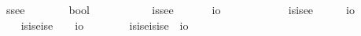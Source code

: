\begin{isabellebody}
\ ssee\ {\isacharequal}\ \ \ \ \ \ \ {\isachardoublequoteopen}{\isacharparenleft}{\isasymlangle}{\isasymzero}{\isasymrangle}{\isasymRightarrow}{\isasymzero}{\isasymRightarrow}bool{\isacharparenright}{\isachardoublequoteclose}\ \ \ \ \ \ \ {\isacharparenleft}{\isachardoublequoteopen}{\isasymlangle}{\isasymlangle}{\isasymzero}{\isasymrangle}{\isacharcomma}{\isasymzero}{\isasymrangle}{\isachardoublequoteclose}{\isacharparenright}\isanewline
\ \ \isamarkupfalse%
\ issee\ {\isacharequal}\ \ \ \ \ \ {\isachardoublequoteopen}{\isacharparenleft}{\isasymlangle}{\isasymzero}{\isasymrangle}{\isasymRightarrow}{\isasymzero}{\isasymRightarrow}io{\isacharparenright}{\isachardoublequoteclose}\ \ \ \ \ \ \ \ {\isacharparenleft}{\isachardoublequoteopen}{\isasymup}{\isasymlangle}{\isasymlangle}{\isasymzero}{\isasymrangle}{\isacharcomma}{\isasymzero}{\isasymrangle}{\isachardoublequoteclose}{\isacharparenright}\isanewline
\ \ \isamarkupfalse%
\ isisee\ {\isacharequal}\ \ \ \ \ {\isachardoublequoteopen}{\isacharparenleft}{\isasymup}{\isasymlangle}{\isasymzero}{\isasymrangle}{\isasymRightarrow}{\isasymzero}{\isasymRightarrow}io{\isacharparenright}{\isachardoublequoteclose}\ \ \ \ \ \ {\isacharparenleft}{\isachardoublequoteopen}{\isasymup}{\isasymlangle}{\isasymup}{\isasymlangle}{\isasymzero}{\isasymrangle}{\isacharcomma}{\isasymzero}{\isasymrangle}{\isachardoublequoteclose}{\isacharparenright}\isanewline
\ \ \isamarkupfalse%
\ isiseise\ {\isacharequal}\ \ \ {\isachardoublequoteopen}{\isacharparenleft}{\isasymup}{\isasymlangle}{\isasymzero}{\isasymrangle}{\isasymRightarrow}{\isasymup}{\isasymlangle}{\isasymzero}{\isasymrangle}{\isasymRightarrow}io{\isacharparenright}{\isachardoublequoteclose}\ \ \ \ {\isacharparenleft}{\isachardoublequoteopen}{\isasymup}{\isasymlangle}{\isasymup}{\isasymlangle}{\isasymzero}{\isasymrangle}{\isacharcomma}{\isasymup}{\isasymlangle}{\isasymzero}{\isasymrangle}{\isasymrangle}{\isachardoublequoteclose}{\isacharparenright}\isanewline
\ \ \isamarkupfalse%
\ isiseisise{\isacharequal}\ \ {\isachardoublequoteopen}{\isacharparenleft}{\isasymup}{\isasymlangle}{\isasymzero}{\isasymrangle}{\isasymRightarrow}{\isasymup}{\isasymlangle}{\isasymup}{\isasymlangle}{\isasymzero}{\isasymrangle}{\isasymrangle}{\isasymRightarrow}io{\isacharparenright}{\isachardoublequoteclose}\ {\isacharparenleft}{\isachardoublequoteopen}{\isasymup}{\isasymlangle}{\isasymup}{\isasymlangle}{\isasymzero}{\isasymrangle}{\isacharcomma}{\isasymup}{\isasymlangle}{\isasymup}{\isasymlangle}{\isasymzero}{\isasymrangle}{\isasymrangle}{\isasymrangle}{\isachardoublequoteclose}{\isacharparenright}%

\end{isabellebody}
